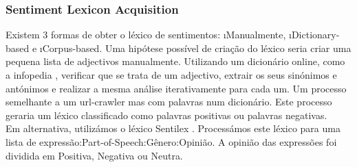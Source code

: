 \subsubsection{Sentiment Lexicon Acquisition}
Existem 3 formas de obter o léxico de sentimentos: \i{Manualmente}, \i{Dictionary-based} e \i{Corpus-based}. Uma hipótese possível de criação do léxico seria criar uma pequena lista de adjectivos manualmente. Utilizando um dicionário online, como a infopedia \cite{infopedia}, verificar que se trata de um adjectivo, extrair os seus sinónimos e antónimos e realizar a mesma análise iterativamente para cada um. Um processo semelhante a um url-crawler mas com palavras num dicionário. Este processo geraria um léxico classificado como palavras positivas ou palavras negativas.\\
Em alternativa, utilizámos o léxico Sentilex \cite{sentilex}. Processámos este léxico para uma lista de expressão:Part-of-Speech:Gênero:Opinião. A opinião das expressões foi dividida em Positiva, Negativa ou Neutra.

